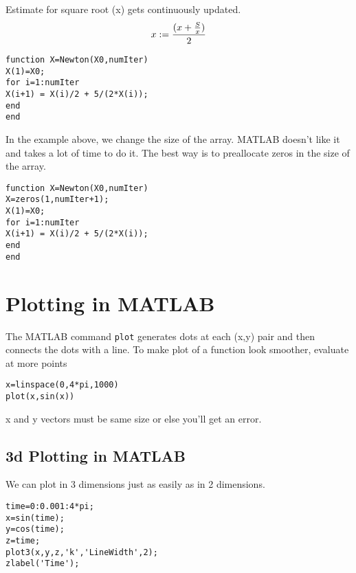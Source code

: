 \documentclass[a4paper,12pt]{article}
\begin{document}
Estimate for square root (x) gets continuously updated.
\[x := \frac{(x+ {S\over x})}{2}\]
\begin{framed}
\begin{verbatim}
function X=Newton(X0,numIter)
X(1)=X0;
for i=1:numIter
X(i+1) = X(i)/2 + 5/(2*X(i));
end
end
\end{verbatim}
\end{framed}

In the example above, we change the size of the array.
MATLAB doesn't like it and takes a lot of time to do it.
The best way is to preallocate zeros in the size of the array.
\begin{framed}
\begin{verbatim}
function X=Newton(X0,numIter)
X=zeros(1,numIter+1);
X(1)=X0;
for i=1:numIter
X(i+1) = X(i)/2 + 5/(2*X(i));
end
end
\end{verbatim}
\end{framed}

\newpage
\section{Plotting in MATLAB}


The MATLAB command \texttt{plot} generates dots at each (x,y) pair and then connects the dots with a line.
To make plot of a function look smoother, evaluate at more points \begin{framed}
\begin{verbatim}
x=linspace(0,4*pi,1000)
plot(x,sin(x))
\end{verbatim}
\end{framed}
x and y vectors must be same size or else you’ll get an error.

\subsection{3d Plotting in MATLAB}


We can plot in 3 dimensions just as easily as in 2 dimensions.


\begin{framed}
\begin{verbatim}
time=0:0.001:4*pi;
x=sin(time);
y=cos(time);
z=time;
plot3(x,y,z,'k','LineWidth',2);
zlabel('Time');
\end{verbatim}
\end{framed}
\end{document}

